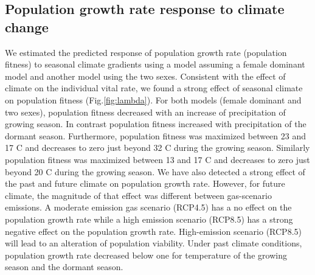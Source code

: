 \documentclass[12pt]{article}
\begin{document}
\subsection*{Population growth rate response to climate change}
We estimated the predicted response of  population growth rate (population fitness) to seasonal climate gradients using a model assuming a female dominant model and another model using the two sexes. 
Consistent with the effect of climate on the individual vital rate, we found a strong effect of seasonal climate on population fitness (Fig.\ref{fig:lambda}). 
For both models (female dominant and two sexes), population fitness decreased with an increase of precipitation of growing season. 
In contrast population fitness increased with precipitation of the dormant season.
Furthermore, population fitness was maximized between 23 and 17 \degree C and decreases to zero just beyond 32 \degree C during the growing season.
Similarly population fitness was maximized between 13 and 17 \degree C and decreases to zero just beyond 20 \degree C during the growing season.
We have also detected a strong effect of the past and future climate on population growth rate. However, for future climate, the magnitude of that effect was different between gas-scenario emissions. 
A moderate emission gas scenario (RCP4.5) has a no effect on the population growth rate while a high emission scenario (RCP8.5) has a strong negative effect on the population growth rate. 
High-emission scenario (RCP8.5) will lead to an alteration of population viability. 
Under past climate conditions, population growth rate decreased below one for temperature of the growing season and the dormant season.
\end{document}
